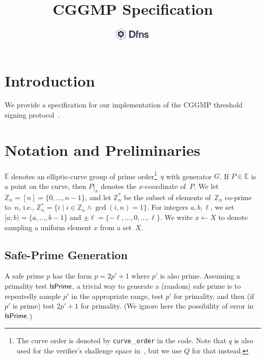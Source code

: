 \documentclass[11pt]{article}
\title{{\bf CGGMP Specification}}
\author{
    \includegraphics[width=50pt]{images/DFNS-logo.png}
}
\date{}
\newcommand{\ignore}[1]{}
\newcommand{\affineX}[1]{#1|_{\textit{x}}}
\newcommand{\E}{\mathbb{E}}
\newcommand{\Z}{\mathbb{Z}}
\newcommand{\?}[1]{\stackrel{?}{#1}}
\begin{document}
\maketitle

\section{Introduction}
We provide a specification for our implementation of the CGGMP threshold signing protocol~\cite{cggmp21}. 

\section{Notation and Preliminaries}
$\E$ denotes an elliptic-curve group of prime order\footnote{The curve order is denoted by {\tt curve}\_{\tt order} in the code. Note that $q$ is also used for the verifier's challenge space in~\cite{cggmp21}, but we use $Q$ for that instead.}~$q$ with generator $G$. %
If $P \in \E$ is a point on the curve, then $\affineX{P}$ denotes the $x$-coordinate of~$P$. We let $\Z_n=[n]=\{0, \dots, n-1\}$, and let $\Z_n^*$ be the subset of elements of~$\Z_n$ co-prime to~$n$, i.e., $\Z^*_n=\{i \mid i \in \Z_n \land \gcd(i, n) = 1\}$. 
For integers $a, b, \ell$, we set 
$[a; b)=\{a, \ldots, b-1\}$
and
$\pm \ell=\{-\ell, \dots, 0, \dots, \ell\}$. 
We write $x \gets X$ to denote sampling a uniform element $x$ from a set~$X$.

\def\isprime{{\sf IsPrime}}

\subsection{Safe-Prime Generation}
\label{sec:safe-prime}
A safe prime $p$ has the form $p=2p'+1$ where $p'$ is also prime. 
Assuming a primality test $\isprime$, 
a trivial way to generate a (random) safe prime is 
to repeatedly sample $p'$ in the appropriate range, test $p'$ for primality, and then (if $p'$ is prime) test $2p'+1$ for primality.
(We ignore here the possibility of error in $\isprime$.)

\ignore{
\begin{algorithm}
\caption{Generating a (random) safe prime}\label{alg:primegen-trivial}
\begin{algorithmic}[1]
\While{(1)}
\State Choose (random) $p'$ in the appropriate range
\State if $(!\isprime(p'))$ {\sf continue}
\State if $(\isprime(2p'+1))$ \Return $p=2p'+1$
\EndWhile
\end{algorithmic}
\end{algorithm}
}
\end{document}
